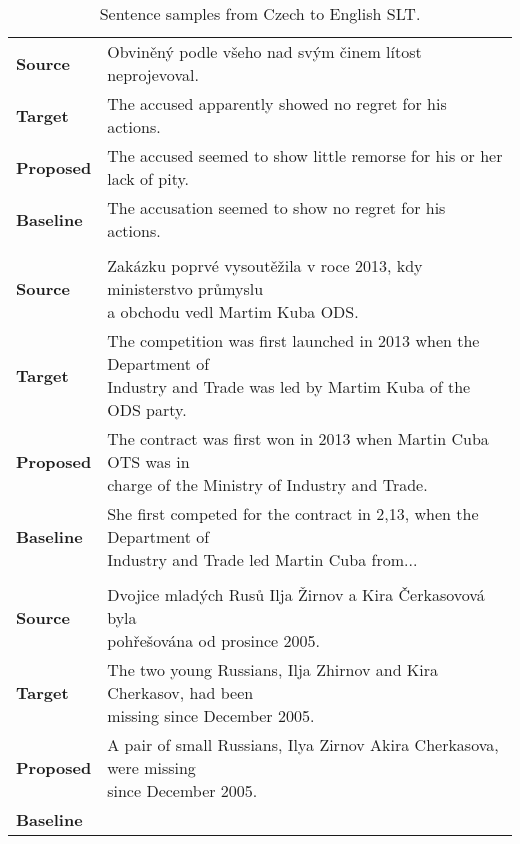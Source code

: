 \begin{table}[]
	\centering
	\begin{tabular}{ll}
		\multicolumn{1}{l|}{\textbf{Source}}   & Obviněný podle všeho nad svým činem lítost neprojevoval.      \\
		\multicolumn{1}{l|}{\textbf{Target}}   & The accused apparently showed no regret for his actions. \\
		\multicolumn{1}{l|}{\textbf{Proposed}} & The accused seemed to show little remorse for his or her lack of pity.      \\
		\multicolumn{1}{l|}{\textbf{Baseline}} & The accusation seemed to show no regret for his actions.    \\
		\textbf{}                              &                                                           \\
		\multicolumn{1}{l|}{\textbf{Source}}   & \makecell[l]{Zakázku poprvé vysoutěžila v roce 2013, kdy ministerstvo průmyslu\\ a obchodu vedl Martim Kuba ODS.}      \\
		\multicolumn{1}{l|}{\textbf{Target}}   & \makecell[l]{The competition was first launched in 2013 when the Department of\\ Industry and Trade was led by Martim Kuba of the ODS party.}      \\
		\multicolumn{1}{l|}{\textbf{Proposed}} & \makecell[l]{The contract was first won in 2013 when Martin Cuba OTS was in\\ charge of the Ministry of Industry and Trade.}                 \\
		\multicolumn{1}{l|}{\textbf{Baseline}} & \makecell[l]{She first competed for the contract in 2,13, when the Department of\\ Industry and Trade led Martin Cuba from...}      \\
		\textbf{}                              &                                                           \\
		\multicolumn{1}{l|}{\textbf{Source}}   & \makecell[l]{Dvojice mladých Rusů Ilja Žirnov a Kira Čerkasovová byla\\ pohřešována od prosince 2005.}      \\
		\multicolumn{1}{l|}{\textbf{Target}}   & \makecell[l]{The two young Russians, Ilja Zhirnov and Kira Cherkasov, had been\\ missing since December 2005.} \\
		\multicolumn{1}{l|}{\textbf{Proposed}} & \makecell[l]{A pair of small Russians, Ilya Zirnov Akira Cherkasova, were missing\\ since December 2005.}      \\
		\multicolumn{1}{l|}{\textbf{Baseline}} &\makecell[l]{Ilya Zernov, Akiracergasov, has been missing since December.}   
	\end{tabular}
	\caption{Sentence samples from Czech to English SLT.}
	\label{tab:cs_en_sample}
\end{table}


